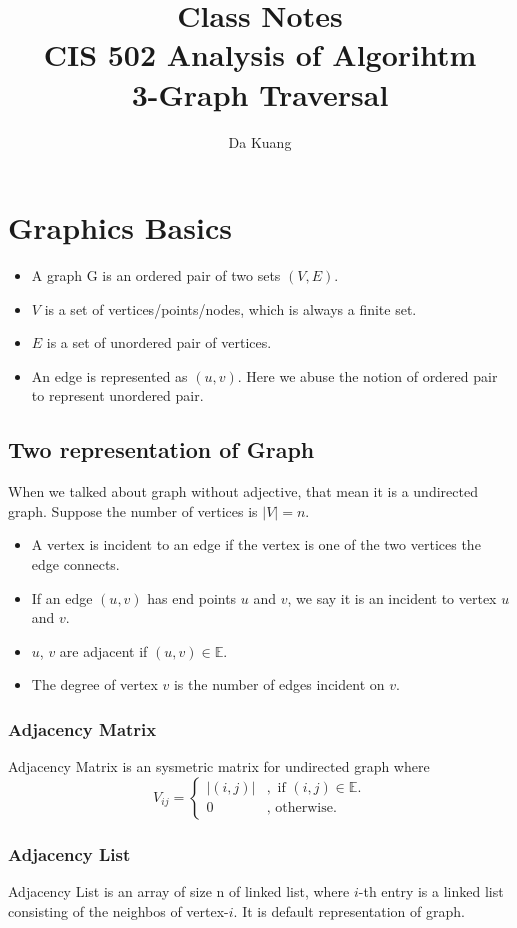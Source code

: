 \documentclass[en,hazy,blue,screen,14pt]{elegantnote}
\title{Class Notes\\CIS 502 Analysis of Algorihtm\\3-Graph Traversal}
\author{Da Kuang}
\institute{University of Pennsylvania}
\date{}
\begin{document}
\maketitle
\newpage
\section{Graphics Basics}
\begin{itemize}
\item A graph G is an ordered pair of two sets $(V, E)$.
\item $V$ is a set of vertices/points/nodes, which is always a finite set.
\item $E$ is a set of unordered pair of vertices.
\item An edge is represented as $(u ,v)$. Here we abuse the notion of ordered pair to represent unordered pair.
\end{itemize}

\subsection{Two representation of Graph}
When we talked about graph without adjective, that mean it is a 
undirected graph. Suppose the number of vertices is $|V| = n$.
\begin{itemize}
 \item A vertex is incident to an edge if the vertex is one of the two vertices 
the edge connects.
\item If an edge $(u, v)$ has end points $u$ and $v$, we say it is an incident 
to vertex $u$ and $v$.
\item $u$, $v$ are adjacent if $(u, v) \in \mathbb{E}$.
\item The degree of vertex $v$ is the number of edges incident on $v$.
\end{itemize}

\subsubsection{Adjacency Matrix}
Adjacency Matrix is an sysmetric matrix for undirected graph where
\[
V_{ij} = 
\begin{cases*}
 |(i,j)| & ,\text{ if $(i,j) \in \mathbb{E}$.}\\
 0  &,\text{ otherwise.}
\end{cases*}
\]
\subsubsection{Adjacency List}
Adjacency List is an array of size n of linked list, where $i$-th entry is 
a linked list consisting of the neighbos of vertex-$i$. It is default 
representation of graph.
\end{document}
